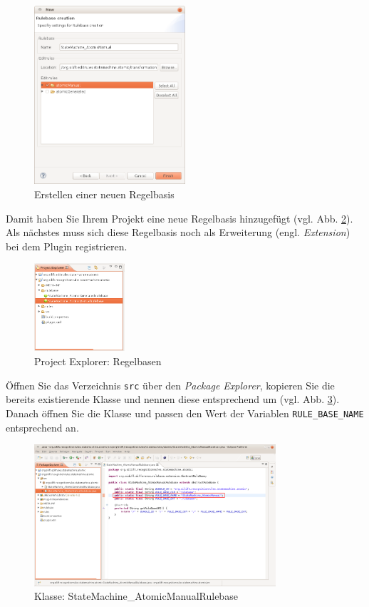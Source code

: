 \documentclass[a4paper]{scrartcl}
\begin{document}
\begin{figure}[H]
\centering
\includegraphics[width=0.5\textwidth]{graphics/silift-rulebase_file3.png}
\caption{Erstellen einer neuen Regelbasis}
\label{silift_rulebase_file3}
\end{figure}

Damit haben Sie Ihrem Projekt eine neue Regelbasis hinzugefügt (vgl. Abb. \ref{silift_RR_Project_Explorer}).
Als nächstes muss sich diese Regelbasis noch als Erweiterung (engl. \textit{Extension}) bei dem Plugin registrieren.


\begin{figure}[H]
\centering
\includegraphics[width=0.3\textwidth]{graphics/silift-RR_Project_Explorer.png}
\caption{Project Explorer: Regelbasen}
\label{silift_RR_Project_Explorer}
\end{figure}

Öffnen Sie das Verzeichnis \texttt{src} über den \textit{Package Explorer}, kopieren Sie die bereits existierende Klasse und nennen diese entsprechend um (vgl. Abb. \ref{silift_Extension_RuleBase}).
Danach öffnen Sie die Klasse und passen den Wert der Variablen \texttt{RULE\_BASE\_NAME} entsprechend an. 

\begin{figure}[H]
\centering
\includegraphics[width=0.8\textwidth]{graphics/silift-Extension_RuleBase.png}
\caption{Klasse: StateMachine\_AtomicManualRulebase}
\label{silift_Extension_RuleBase}
\end{figure}
\end{document}
